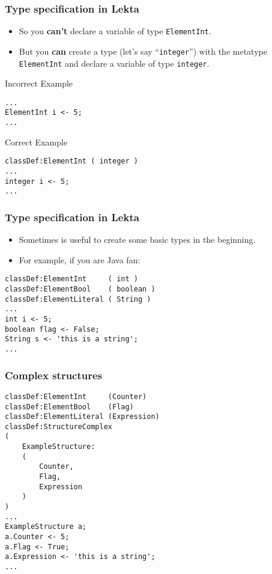 \documentclass[11pt]{beamer}
\begin{document}
\begin{frame}[fragile]
\frametitle{Type specification in Lekta}
\begin{itemize}
	\item So you \textbf{can't} declare a variable of type \texttt{ElementInt}.	
	\pause
	\item But you \textbf{can} create a type (let's say ``\texttt{integer}'') with the metatype \texttt{ElementInt} and declare a variable of type \texttt{integer}.
\end{itemize}
\pause
{}
\begin{block}{Incorrect Example}
\scriptsize
\begin{lstlisting}[language=lekta]
...
ElementInt i <- 5; 
...
\end{lstlisting}
\end{block}
\pause
{}
\begin{block}{Correct Example}
\scriptsize
\begin{lstlisting}[language=lekta]
classDef:ElementInt ( integer )
...
integer i <- 5;
...
\end{lstlisting}
\end{block}
\end{frame}

\begin{frame}[fragile]
\frametitle{Type specification in Lekta}
\begin{itemize}
	\item Sometimes is useful to create some basic types in the beginning.
	\pause
	\item For example, if you are Java fan:
\end{itemize}
\begin{lstlisting}[language=lekta]
classDef:ElementInt     ( int ) 
classDef:ElementBool    ( boolean ) 
classDef:ElementLiteral ( String )
...
int i <- 5; 
boolean flag <- False;
String s <- 'this is a string';
...
\end{lstlisting}
\end{frame}

\begin{frame}[fragile]
\frametitle{Complex structures}
\footnotesize
\begin{lstlisting}[language=lekta]
classDef:ElementInt     (Counter)
classDef:ElementBool    (Flag)
classDef:ElementLiteral (Expression)
classDef:StructureComplex 
( 
	ExampleStructure:
	(
		Counter,
		Flag,
		Expression
	)
)
...
ExampleStructure a;
a.Counter <- 5;
a.Flag <- True;
a.Expression <- 'this is a string';
...
\end{lstlisting}
\end{frame}
\end{document}
